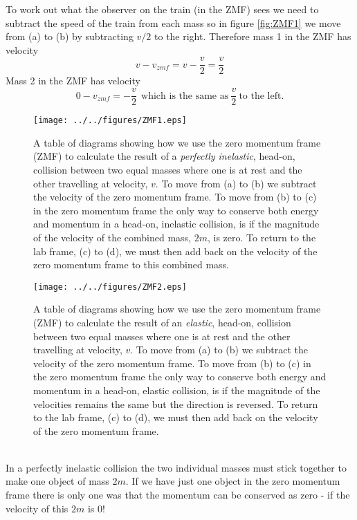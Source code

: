 \noindent To work out what the observer on the train (in the ZMF) sees we need to subtract the speed of the train from each mass so in figure \ref{fig:ZMF1} we move from (a) to (b) by subtracting $v/2$ to the right.  Therefore mass 1 in the ZMF has velocity
\begin{equation}
v-v_{zmf}=v-\frac{v}{2}=\frac{v}{2}
\end{equation}
Mass 2 in the ZMF has velocity
\begin{equation}
0-v_{zmf}=-\frac{v}{2}\ \  \mbox{which is the same as}\ \frac{v}{2}\ \mbox{to the left}.
\end{equation}
\addtocounter{figure}{-1}
\begin{wrapfigure}{r}{9cm}
\texttt{[image: ../../figures/ZMF1.eps]}
\caption{A table of diagrams showing how we use the zero momentum frame (ZMF) to calculate the result of a {\it perfectly inelastic}, head-on, collision between two equal masses where one is at rest and the other travelling at velocity, $v$.  To move from (a) to (b) we subtract the velocity of the zero momentum frame.  To move from (b) to (c) in the zero momentum frame the only way to conserve both energy and momentum in a head-on, inelastic collision, is if the magnitude of the velocity of the combined mass, $2m$, is zero.  To return to the lab frame, (c) to (d), we must then add back on the velocity of the zero momentum frame to this combined mass.}\vspace{0.5cm}
\label{fig:ZMF1}
\texttt{[image: ../../figures/ZMF2.eps]}
\caption{A table of diagrams showing how we use the zero momentum frame (ZMF) to calculate the result of an {\it elastic}, head-on, collision between two equal masses where one is at rest and the other travelling at velocity, $v$.  To move from (a) to (b) we subtract the velocity of the zero momentum frame.  To move from (b) to (c) in the zero momentum frame the only way to conserve both energy and momentum in a head-on, elastic collision, is if the magnitude of the velocities remains the same but the direction is reversed.  To return to the lab frame, (c) to (d), we must then add back on the velocity of the zero momentum frame.} 
\label{fig:ZMF2} 
\end{wrapfigure}
\\
\noindent In a perfectly inelastic collision the two individual masses must stick together to make one object of mass $2m$.  If we have just one object in the zero momentum frame there is only one was that the momentum can be conserved as zero - if the velocity of this $2m$ is $ 0$! \\
